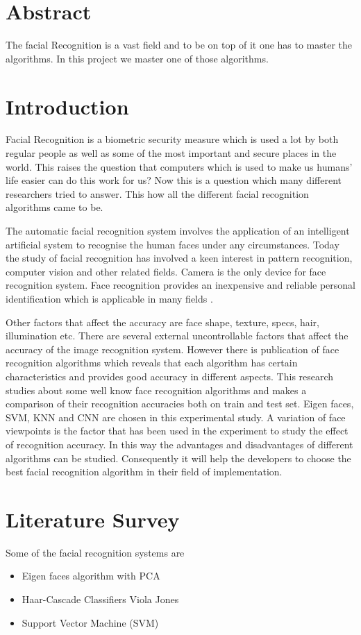 \documentclass[14.49pt, a4paper, one side, margin = 2in]{article}
\begin{document}
\section{Abstract}
The facial Recognition is a vast field and to be on top of it one has to master the algorithms. In this project we master one of those algorithms.
\clearpage
\section{Introduction}
Facial Recognition is a biometric security measure which is used a lot by both regular people as well as some of the most important and secure places in the world. This raises the question that computers which is used to make us humans' life easier can do this work for us? Now this is a question which many different researchers tried to answer. This how all the different facial recognition algorithms came to be.

The automatic facial recognition system involves the application of an intelligent artificial system to  
recognise the human faces under any circumstances. Today the study of facial recognition has  
involved a keen interest in pattern recognition, computer vision and other related fields. Camera is the only device for face recognition system. Face recognition provides an inexpensive and reliable  
personal identification which is applicable in many fields
\cite{phankokkruad2017influence}.

Other factors that affect the accuracy are face shape, texture, specs, hair,
illumination etc. There are several external uncontrollable factors that affect the accuracy of the image
recognition system. However there is publication of face recognition algorithms which reveals that
each algorithm has certain characteristics and provides good accuracy in different aspects.
This research studies about some well know face recognition algorithms and makes a comparison of
their recognition accuracies both on train and test set. Eigen faces, SVM, KNN and CNN are chosen
in this experimental study. A variation of face viewpoints is the factor that has been used in the
experiment to study the effect of recognition accuracy. In this way the advantages and disadvantages
of different algorithms can be studied. Consequently it will help the developers to choose the best
facial recognition algorithm in their field of implementation\cite{paul2020comparative}.
\clearpage
\section{Literature Survey}
Some of the facial recognition systems are
\begin{itemize}
    \item {Eigen faces algorithm with PCA}
    \item {Haar-Cascade Classifiers Viola Jones}
    \item {Support Vector Machine (SVM)}
\end{itemize}
\end{document}
